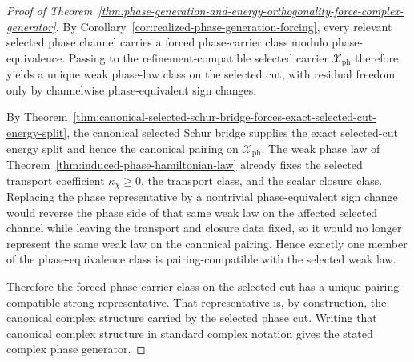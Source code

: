 \begin{proof}[Proof of Theorem~\ref{thm:phase-generation-and-energy-orthogonality-force-complex-generator}]
\label{proof:thm:phase-generation-and-energy-orthogonality-force-complex-generator}
By Corollary~\ref{cor:realized-phase-generation-forcing}, every relevant
selected phase channel carries a forced phase-carrier class modulo
phase-equivalence. Passing to the refinement-compatible selected carrier
\(\mathcal X_{\mathrm{ph}}\) therefore yields a unique weak phase-law class on
the selected cut, with residual freedom only by channelwise phase-equivalent
sign changes.

By
Theorem~\ref{thm:canonical-selected-schur-bridge-forces-exact-selected-cut-energy-split},
the canonical selected Schur bridge supplies the exact selected-cut energy
split and hence the canonical pairing on \(\mathcal X_{\mathrm{ph}}\). The
weak phase law of Theorem~\ref{thm:induced-phase-hamiltonian-law} already fixes
the selected transport coefficient \(\kappa_{\chi}\ge 0\), the transport class,
and the scalar closure class. Replacing the phase representative by a
nontrivial phase-equivalent sign change would reverse the phase side of that
same weak law on the affected selected channel while leaving the transport and
closure data fixed, so it would no longer represent the same weak law on the
canonical pairing. Hence exactly one member of the phase-equivalence class is
pairing-compatible with the selected weak law.

Therefore the forced phase-carrier class on the selected cut has a unique
pairing-compatible strong representative. That representative is, by
construction, the canonical complex structure carried by the selected phase
cut. Writing that canonical complex structure in standard complex notation
gives the stated complex phase generator.
\end{proof}

